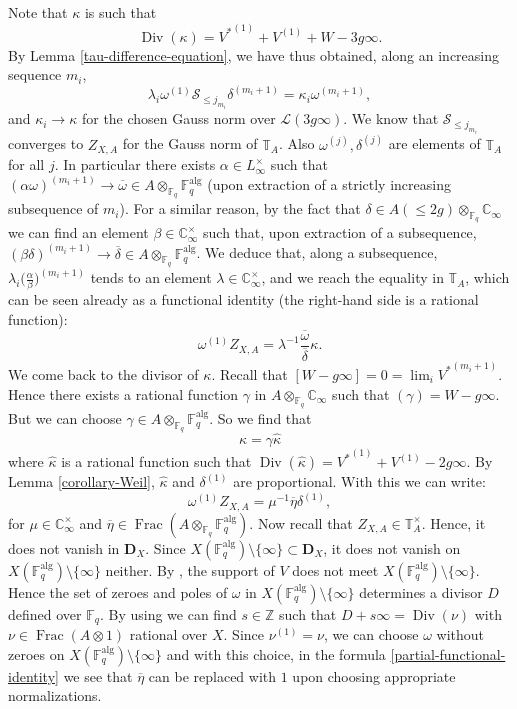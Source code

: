 \documentclass[11pt]{amsart}
\numberwithin{equation}{section}
\newcommand{\Div}{\operatorname{Div}}
\newcommand{\ZZ}{\mathbb{Z}}
\newcommand{\FF}{\mathbb{F}}
\newcommand{\CC}{\mathbb{C}}
\newcommand{\TT}{\mathbb{T}}
\begin{document}
Note that
 $\kappa$ is such that
$$\Div(\kappa)={V^*}^{(1)}+V^{(1)}+W-3g\infty.$$
By Lemma \ref{tau-difference-equation}, we have thus obtained, along an increasing sequence $m_i$, 
$$\lambda_i\omega^{(1)}\mathcal{S}_{\leq j_{m_i}}\delta^{(m_i+1)}=\kappa_i\omega^{(m_i+1)},$$
and $\kappa_i\rightarrow\kappa$ for the chosen Gauss norm over $\mathcal{L}(3g\infty)$. We know that $\mathcal{S}_{\leq j_{m_i}}$ converges to $Z_{X,A}$ for the Gauss norm of $\TT_A$. Also $\omega^{(j)},\delta^{(j)}$ are elements of $\TT_A$ for all $j$. In particular there exists
$\alpha\in L_\infty^\times$ such that $(\alpha\omega)^{(m_i+1)}\rightarrow\overline{\omega}\in A\otimes_{\FF_q}\FF_q^{\text{alg}}$ (upon extraction of a strictly increasing subsequence of $m_i$).
For a similar reason, by the fact that $\delta\in A(\leq 2g)\otimes_{\FF_q}\CC_\infty$ we can find an element $\beta\in\CC_\infty^\times$ such that, upon extraction of a subsequence, $(\beta\delta)^{(m_i+1)}\rightarrow\overline{\delta}\in A\otimes_{\FF_q}\FF_q^{\text{alg}}$. We deduce that, along a subsequence, $\lambda_i\big(\frac{\alpha}{\beta}\big)^{(m_i+1)}$
tends to an element $\lambda\in\CC_\infty^\times$, and we reach the equality in $\TT_A$, which can be seen already as a functional identity (the right-hand side is a rational function):
$$
\omega^{(1)}Z_{X,A}=\lambda^{-1}\frac{\overline{\omega}}{\overline{\delta}}\kappa.
$$
We come back to the divisor of $\kappa$. Recall that $[W-g\infty]=0=\lim_i{V^*}^{(m_i+1)}$. Hence there exists a rational function $\gamma$ in $A\otimes_{\FF_q}\CC_\infty$
such that $(\gamma)=W-g\infty$. But we can choose $\gamma\in A\otimes_{\FF_q}\FF_q^{\text{alg}}$. So we find that
$$\kappa=\gamma\hat{\kappa}$$
where $\hat{\kappa}$ is a rational function such that $\Div(\hat{\kappa})={V^*}^{(1)}+V^{(1)}-2g\infty$. By Lemma \ref{corollary-Weil},
$\hat{\kappa}$ and $\delta^{(1)}$ are proportional.
With this we can write:
\begin{equation}\label{partial-functional-identity}
\omega^{(1)}Z_{X,A}=\mu^{-1}\overline{\eta}\delta^{(1)},
\end{equation}
for $\mu\in\CC_\infty^\times$ and $\overline{\eta}\in\operatorname{Frac}(A\otimes_{\FF_q}\FF_q^{\text{alg}})$.
Now recall that $Z_{X,A}\in\TT_A^\times$. Hence, it does not vanish in $\boldsymbol{D}_X$. Since $X(\FF_q^{\text{alg}})\setminus\{\infty\}\subset\boldsymbol{D}_X$, it does not vanish on $X(\FF_q^{\text{alg}})\setminus\{\infty\}$ neither.
By \cite[Proposition 4.23]{FER1}, the support of $V$ does not meet $X(\FF_q^{\text{alg}})\setminus\{\infty\}$.
Hence the set of zeroes and poles of $\omega$ in $X(\FF_q^{\text{alg}})\setminus\{\infty\}$ determines a divisor $D$ defined over $\FF_q$. By using \cite[Proposition 4.16]{FER1} we can find $s\in\ZZ$ such that $D+s\infty=\Div(\nu)$ with $\nu\in \operatorname{Frac}(A\otimes1)$ rational over $X$. Since $\nu^{(1)}=\nu$, we can choose $\omega$ without zeroes on 
$X(\FF_q^{\text{alg}})\setminus\{\infty\}$ and with this choice, in the formula \eqref{partial-functional-identity} we see that
$\overline{\eta}$ can be replaced with $1$ upon choosing appropriate normalizations. 
\end{document}
